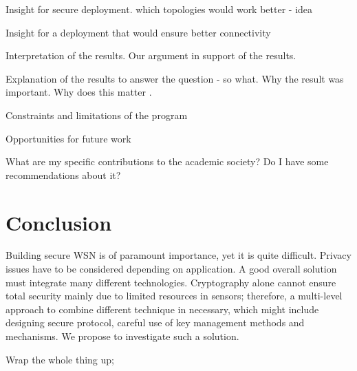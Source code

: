 \documentclass[conference,final]{IEEEtran}
\begin{document}
Insight for secure deployment. which topologies would work better - idea

Insight for a deployment that would ensure better connectivity







Interpretation of the results.
Our argument in support of the results.

Explanation of the results to answer the question - so what.
Why the result was important.
Why does this matter .

Constraints and limitations of the program

Opportunities for future work

What are my specific contributions to the academic society?
Do I have some recommendations about it?


\section{Conclusion}

Building secure WSN is of paramount importance, yet it is quite difficult. Privacy issues have to be considered depending on application. A good overall solution must integrate many different technologies. Cryptography alone cannot ensure total security mainly due to limited resources in sensors; therefore, a multi-level approach to combine different technique in necessary, which might  include designing secure protocol, careful use of key management methods and mechanisms. We propose to investigate such a solution.

\label{sec:conc}
Wrap the whole thing up;


\end{document}
